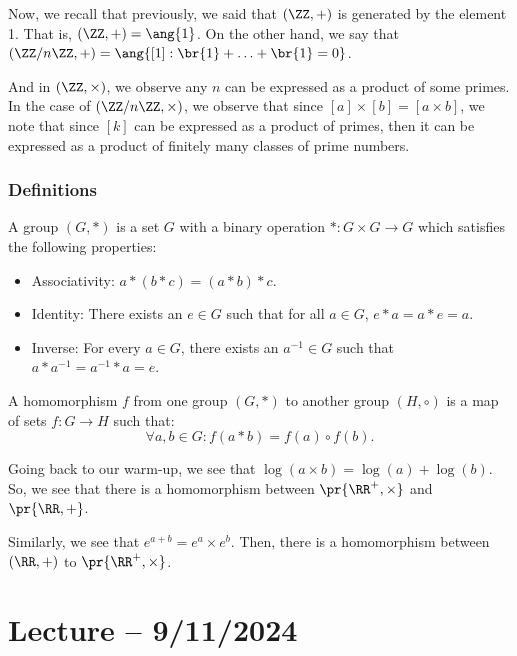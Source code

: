 \documentclass[openany]{book}
\begin{document}
Now, we recall that previously, we said that $(\ZZ, +)$ is generated by the element 1. That is, $(\ZZ, +) = \ang{1}$. On the other hand, we say that $(\ZZ/n\ZZ, +) = \ang{[1] : \br{1} + \ldots + \br{1} = 0}$.

And in $(\ZZ, \times)$, we observe any $n$ can be expressed as a product of some primes. In the case of $(\ZZ/n\ZZ, \times)$, we observe that since $[a] \times [b] = [a \times b]$, we note that since $[k]$ can be expressed as a product of primes, then it can be expressed as a product of finitely many classes of prime numbers.

\subsubsection{Definitions}
\begin{defn}[Groups]
	A group $(G, *)$ is a set $G$ with a binary operation $*: G \times G \rightarrow G$ which satisfies the following properties:
	\begin{itemize}
		\item Associativity: $a * (b * c) = (a * b) * c$.
		\item Identity: There exists an $e \in G$ such that for all $a \in G$, $e * a = a * e = a$.
		\item Inverse: For every $a \in G$, there exists an $a^{-1} \in G$ such that $a * a^{-1} = a^{-1} * a = e$.
	\end{itemize}
\end{defn}

\begin{defn}[Homomorphism]
	A homomorphism $f$ from one group $(G, *)$ to another group $(H, \circ)$ is a map of sets $f : G \rightarrow H$ such that:
	\begin{equation*}
		\forall a,b \in G : f(a * b) = f(a) \circ f(b).
	\end{equation*}
\end{defn}
\begin{example}
	Going back to our warm-up, we see that $\log(a \times b) = \log(a) + \log(b)$. So, we see that there is a homomorphism between $\pr{\RR^{+}, \times}$ and $\pr{\RR, +}$.
	
	Similarly, we see that $e^{a + b} = e^{a} \times e^{b}$. Then, there is a homomorphism between $(\RR, +)$ to $\pr{\RR^{+}, \times}$.
\end{example}

\section{Lecture -- 9/11/2024}
\end{document}
